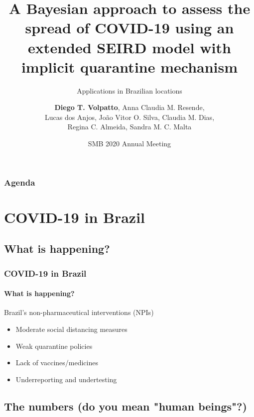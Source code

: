 \documentclass{beamer}
\title{A Bayesian approach to assess the spread of COVID-19 using an extended SEIRD model with implicit quarantine mechanism}
\subtitle{Applications in Brazilian locations}
\date[eSMB 2020]{SMB 2020 Annual Meeting}
\author[Diego T. Volpatto]{
	\textbf{Diego T. Volpatto}\inst{1}, Anna Claudia M. Resende\inst{1}, \\
	Lucas dos Anjos\inst{1}, Jo\~ao Vitor O. Silva\inst{1}, Claudia M. Dias\inst{2}, \\
	Regina C. Almeida\inst{1}, Sandra M. C. Malta\inst{1}
}
\institute[LNCC] %
{
\inst{1} Laboratório Nacional de Computação Científica (LNCC) \\ %
\inst{2} Universidade Federal Rural do Rio de Janeiro (UFRRJ)
}
\begin{document}
\begin{frame}
\titlepage
\end{frame}

\begin{frame}
\frametitle{Agenda} %
\tableofcontents %
\end{frame}

\section{COVID-19 in Brazil}

\subsection{What is happening?}

\begin{frame} 
\frametitle{COVID-19 in Brazil} 
\framesubtitle{What is happening?} 
\begin{block}{Brazil's non-pharmaceutical interventions (NPIs)}
	\begin{itemize}
		\item Moderate social distancing measures
		\item Weak quarantine policies
		\item Lack of vaccines/medicines
		\item Underreporting and undertesting
	\end{itemize}
\end{block}
\end{frame}

\subsection{The numbers (do you mean "human beings"?)}
\end{document}
